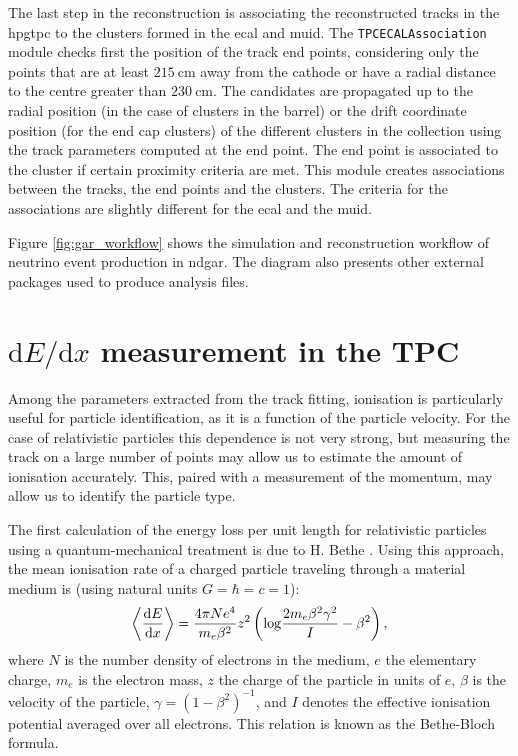 The last step in the reconstruction is associating the reconstructed tracks in the \gls{hpgtpc} to the clusters formed in the \gls{ecal} and \gls{muid}. The \texttt{TPCECALAssociation} module checks first the position of the track end points, considering only the points that are at least $215~\mathrm{cm}$ away from the cathode or have a radial distance to the centre greater than $230~\mathrm{cm}$. The candidates are propagated up to the radial position (in the case of clusters in the barrel) or the drift coordinate position (for the end cap clusters) of the different clusters in the collection using the track parameters computed at the end point. The end point is associated to the cluster if certain proximity criteria are met. This module creates associations between the tracks, the end points and the clusters. The criteria for the associations are slightly different for the \gls{ecal} and the \gls{muid}.

Figure \ref{fig:gar_workflow} shows the simulation and reconstruction workflow of neutrino event production in \gls{ndgar}. The diagram also presents other external packages used to produce analysis files.

\section[\texorpdfstring{$\mathrm{d}E/\mathrm{d}x$}{dE/dx} measurement in the TPC]{\boldmath\texorpdfstring{$\mathrm{d}E/\mathrm{d}x$}{dE/dx} measurement in the TPC}\label{section:dEdx}

Among the parameters extracted from the track fitting, ionisation is particularly useful for particle identification, as it is a function of the particle velocity. For the case of relativistic particles this dependence is not very strong, but measuring the track on a large number of points may allow us to estimate the amount of ionisation accurately. This, paired with a measurement of the momentum, may allow us to identify the particle type.

The first calculation of the energy loss per unit length for relativistic particles using a quantum-mechanical treatment is due to H. Bethe \cite{Bethe1930}. Using this approach, the mean ionisation rate of a charged particle traveling through a material medium is (using natural units $G=\hbar=c=1$):
\begin{equation}\label{Eq:3.1}
    \expval{\frac{\mathrm{d}E}{\mathrm{d}x}} = \frac{4 \pi N e^{4}}{m_{e}\beta^{2}} z^{2} \left(\mathrm{log} \frac{2m_{e}\beta^{2}\gamma^{2}}{I} - \beta^{2}\right),
\end{equation}
where $N$ is the number density of electrons in the medium, $e$ the elementary charge, $m_{e}$ is the electron mass, $z$ the charge of the particle in units of $e$, $\beta$ is the velocity of the particle, $\gamma = (1-\beta^{2})^{-1}$, and $I$ denotes the effective ionisation potential averaged over all electrons. This relation is known as the Bethe-Bloch formula.

